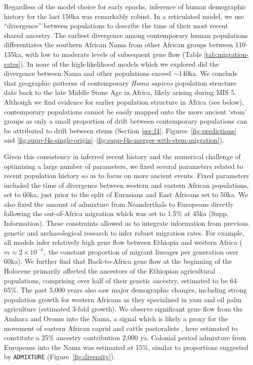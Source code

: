 \documentclass[]{article}
\begin{document}
Regardless of the model choice for early epochs, inference of human demographic
history for the last 150ka was remarkably robust.
In a reticulated model, we use ``divergence'' between populations to describe
the time of their most recent shared ancestry.
The earliest divergence among
contemporary human populations differentiates the southern African Nama from
other African groups between 110--135ka, with low to moderate levels of
subsequent gene flow (Table \ref{tab:migration-rates}). In none of the
high-likelihood models which we explored did the divergence between Nama and
other populations exceed $\sim$140ka. 
We conclude that geographic patterns of contemporary \emph{Homo sapiens} population structure
date back to the late Middle Stone Age in Africa, likely arising during MIS 5.
Although we find evidence for earlier population structure in Africa (see
below), contemporary populations cannot be easily mapped onto the more ancient
`stem' groups as only a small proportion of drift between contemporary populations can
be attributed to drift between stems (Section \ref{sec:f4},  Figures~\ref{fig:predictions} and
\ref{fig:supp-f4s-single-origin}--\ref{fig:supp-f4s-merger-with-stem-migration}). 

Given this consistency in inferred recent history and the numerical challenge
of optimizing a large number of parameters, we fixed several parameters related
to recent population history so as to focus on more ancient events. 
Fixed parameters included
the time of divergence between western and eastern African populations,
set to 60ka, just prior to the split of Eurasians and East Africans set to 50ka. 
We also fixed the amount of admixture from Neanderthals to Europeans directly
following the out-of-Africa migration which was set to 1.5\% at 45ka (Supp. Information).
These constraints allowed us to integrate information from previous genetic
and archaeological research to infer robust migration rates.
For example, all models infer relatively high gene flow between Ethiopia and western Africa
($m\approx2\times10^{-4},$ the constant proportion of migrant lineages per generation over 60ka).
We further find that Back-to-Africa gene flow at the beginning of the Holocene primarily
affected the ancestors of the Ethiopian agricultural populations, comprising
over half of their genetic ancestry, estimated to be 64--65\%. The past 5,000
years also saw major demographic changes, including strong population growth
for western Africans as they specialized in yam and oil palm agriculture
(estimated 3-fold growth). We observe significant gene flow from the Amhara and
Oromo into the Nama, a signal which is likely a proxy for the movement of
eastern African caprid and cattle pastoralists
\citep{Henn2008-xo,Breton2014-xb}, here estimated to constitute a 25\% ancestry
contribution 2,000 ya. Colonial period admixture from Europeans into the Nama
was estimated at 15\%, similar to proportions suggested by \texttt{ADMIXTURE}
(Figure~\ref{fig:diversity}).
\end{document}
